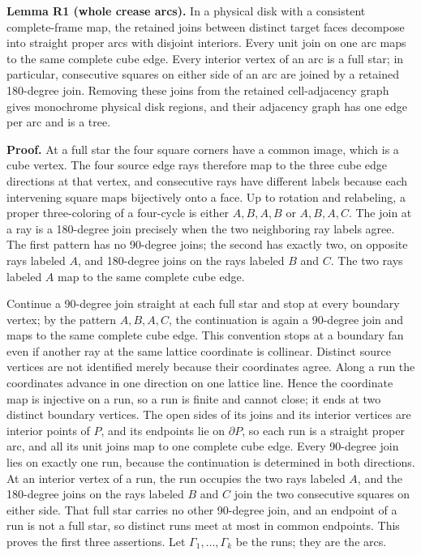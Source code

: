 \documentclass[
  11pt,
]{article}
\begin{document}
\textbf{Lemma R1 (whole crease arcs).} In a physical disk with a
consistent complete-frame map, the retained joins between distinct
target faces decompose into straight proper arcs with disjoint
interiors. Every unit join on one arc maps to the same complete cube
edge. Every interior vertex of an arc is a full star; in particular,
consecutive squares on either side of an arc are joined by a retained
180-degree join. Removing these joins from the retained cell-adjacency
graph gives monochrome physical disk regions, and their adjacency graph
has one edge per arc and is a tree.

\textbf{Proof.} At a full star the four square corners have a common
image, which is a cube vertex. The four source edge rays therefore map
to the three cube edge directions at that vertex, and consecutive rays
have different labels because each intervening square maps bijectively
onto a face. Up to rotation and relabeling, a proper three-coloring of a
four-cycle is either \(A,B,A,B\) or \(A,B,A,C\). The join at a ray is a
180-degree join precisely when the two neighboring ray labels agree. The
first pattern has no 90-degree joins; the second has exactly two, on
opposite rays labeled \(A\), and 180-degree joins on the rays labeled
\(B\) and \(C\). The two rays labeled \(A\) map to the same complete
cube edge.

Continue a 90-degree join straight at each full star and stop at every
boundary vertex; by the pattern \(A,B,A,C\), the continuation is again a
90-degree join and maps to the same complete cube edge. This convention
stops at a boundary fan even if another ray at the same lattice
coordinate is collinear. Distinct source vertices are not identified
merely because their coordinates agree. Along a run the coordinates
advance in one direction on one lattice line. Hence the coordinate map
is injective on a run, so a run is finite and cannot close; it ends at
two distinct boundary vertices. The open sides of its joins and its
interior vertices are interior points of \(P\), and its endpoints lie on
\(\partial P\), so each run is a straight proper arc, and all its unit
joins map to one complete cube edge. Every 90-degree join lies on
exactly one run, because the continuation is determined in both
directions. At an interior vertex of a run, the run occupies the two
rays labeled \(A\), and the 180-degree joins on the rays labeled \(B\)
and \(C\) join the two consecutive squares on either side. That full
star carries no other 90-degree join, and an endpoint of a run is not a
full star, so distinct runs meet at most in common endpoints. This
proves the first three assertions. Let \(\Gamma_1,\ldots,\Gamma_k\) be
the runs; they are the arcs.
\end{document}
